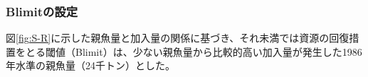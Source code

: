 \subsubsection{Blimitの設定}   図\ref{fig:S-R}に示した親魚量と加入量の関係に基づき、それ未満では資源の回復措置をとる閾値（Blimit）は、少ない親魚量から比較的高い加入量が発生した1986年水準の親魚量（24千トン）とした。

